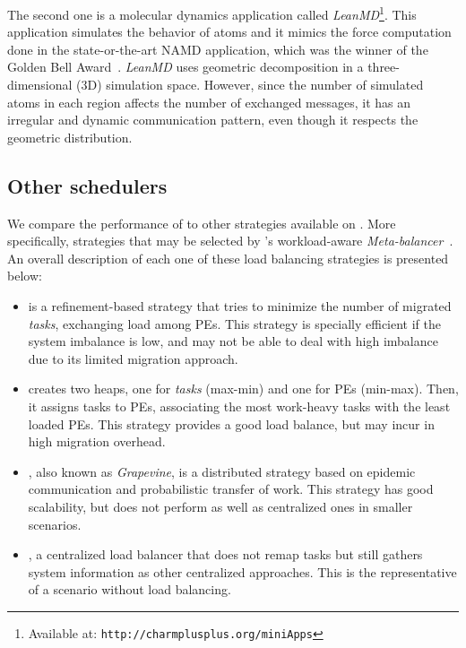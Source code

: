 The second one is a molecular dynamics application called \textit{LeanMD}\footnote{Available at: \texttt{http://charmplusplus.org/miniApps}}.
This application simulates the behavior of atoms and it mimics the force computation done in the state-or-the-art NAMD application, which was the winner of the Golden Bell Award~\cite{namd}.
\textit{LeanMD} uses geometric decomposition in a three-dimensional ($3$D) simulation space.
However, since the number of simulated atoms in each region affects the number of exchanged messages, it has an irregular and dynamic communication pattern, even though it respects the geometric distribution.

\subsection{Other schedulers}

We compare the performance of \packdrop to other strategies available on \charm.
More specifically, strategies that may be selected by \charm 's workload-aware \textit{Meta-balancer}~\cite{MenonPHD}.
An overall description of each one of these load balancing strategies is presented below:

\begin{itemize}
	\item {} is a refinement-based strategy that tries to minimize the number of migrated \textit{tasks}, exchanging load among PEs.
This strategy is specially efficient if the system imbalance is low, and may not be able to deal with high imbalance due to its limited migration approach.
	\item \greedylb creates two heaps, one for \textit{tasks} (max-min) and one for PEs (min-max). 
Then, it assigns tasks to PEs, associating the most work-heavy tasks with the least loaded PEs.
This strategy provides a good load balance, but may incur in high migration overhead.
    \item \distributedlb, also known as \textit{Grapevine}, is a distributed strategy based on epidemic communication and probabilistic transfer of work.
   This strategy has good scalability, but does not perform as well as centralized ones in smaller scenarios.
   \item \dummylb, a centralized load balancer that does not remap tasks but still gathers system information as other centralized approaches.
   This is the representative of a scenario without load balancing.

\end{itemize}



